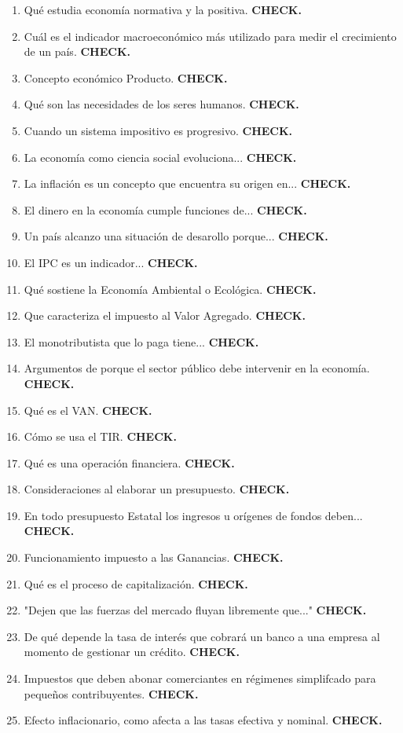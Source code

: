 \documentclass[10pt,a4paper]{article}
\begin{document}
\begin{enumerate}
\item Qué estudia economía normativa y la positiva. \textbf{CHECK.}
\item Cuál es el indicador macroeconómico más utilizado para medir el crecimiento de un país. \textbf{CHECK.}
\item Concepto económico Producto. \textbf{CHECK.}
\item Qué son las necesidades de los seres humanos. \textbf{CHECK.}
\item Cuando un sistema impositivo es progresivo. \textbf{CHECK.}
\item La economía como ciencia social evoluciona... \textbf{CHECK.}
\item La inflación es un concepto que encuentra su origen en... \textbf{CHECK.}
\item El dinero en la economía cumple funciones de... \textbf{CHECK.}
\item Un país alcanzo una situación de desarollo porque... \textbf{CHECK.}
\item El IPC es un indicador... \textbf{CHECK.}
\item Qué sostiene la Economía Ambiental o Ecológica. \textbf{CHECK.}
\item Que caracteriza el impuesto al Valor Agregado. \textbf{CHECK.}
\item El monotributista que lo paga tiene... \textbf{CHECK.}
\item Argumentos de porque el sector público debe intervenir en la economía.  \textbf{CHECK.}
\item Qué es el VAN. \textbf{CHECK.}
\item Cómo se usa el TIR. \textbf{CHECK.}
\item Qué es una operación financiera. \textbf{CHECK.}
\item Consideraciones al elaborar un presupuesto. \textbf{CHECK.}
\item En todo presupuesto Estatal los ingresos u orígenes de fondos deben... \textbf{CHECK.}
\item Funcionamiento impuesto a las Ganancias. \textbf{CHECK.}
\item Qué es el proceso de capitalización. \textbf{CHECK.}
\item "Dejen que las fuerzas del mercado fluyan libremente que..." \textbf{CHECK.}
\item De qué depende la tasa de interés que cobrará un banco a una empresa al momento de gestionar un crédito. \textbf{CHECK.}
\item Impuestos que deben abonar comerciantes en régimenes simplifcado para pequeños contribuyentes. \textbf{CHECK.}
\item Efecto inflacionario, como afecta a las tasas efectiva y nominal. \textbf{CHECK.}
\end{enumerate}
\end{document}
